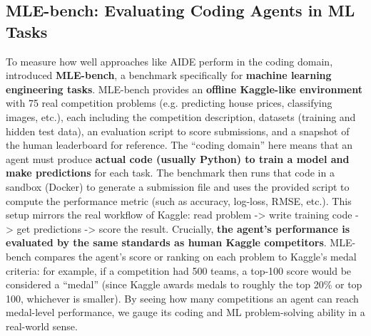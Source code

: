 \subsection{MLE-bench: Evaluating Coding Agents in ML Tasks}

To measure how well approaches like AIDE perform in the coding domain, \cite{mlebench} introduced \textbf{MLE-bench}, a benchmark specifically for \textbf{machine learning engineering tasks}. MLE-bench provides an \textbf{offline Kaggle-like environment} with 75 real competition problems (e.g. predicting house prices, classifying images, etc.), each including the competition description, datasets (training and hidden test data), an evaluation script to score submissions, and a snapshot of the human leaderboard for reference. The “coding domain” here means that an agent must produce \textbf{actual code (usually Python) to train a model and make predictions} for each task. The benchmark then runs that code in a sandbox (Docker) to generate a submission file and uses the provided script to compute the performance metric (such as accuracy, log-loss, RMSE, etc.). This setup mirrors the real workflow of Kaggle: read problem -> write training code -> get predictions -> score the result. Crucially, \textbf{the agent’s performance is evaluated by the same standards as human Kaggle competitors}. MLE-bench compares the agent’s score or ranking on each problem to Kaggle’s medal criteria: for example, if a competition had 500 teams, a top-100 score would be considered a “medal” (since Kaggle awards medals to roughly the top 20\% or top 100, whichever is smaller). By seeing how many competitions an agent can reach medal-level performance, we gauge its coding and ML problem-solving ability in a real-world sense.

